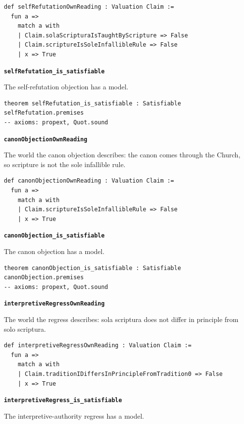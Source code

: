 \documentclass[11pt]{article}
\begin{document}
{\small\begin{verbatim}
def selfRefutationOwnReading : Valuation Claim :=
  fun a =>
    match a with
    | Claim.solaScripturaIsTaughtByScripture => False
    | Claim.scriptureIsSoleInfallibleRule => False
    | x => True
\end{verbatim}}
\par\medskip\noindent\textbf{\texttt{self\allowbreak{}Refutation\_\allowbreak{}is\_\allowbreak{}satisfiable}}\par\nobreak\noindent
The self-refutation objection has a model.

{\small\begin{verbatim}
theorem selfRefutation_is_satisfiable : Satisfiable selfRefutation.premises
-- axioms: propext, Quot.sound
\end{verbatim}}
\par\medskip\noindent\textbf{\texttt{canon\allowbreak{}Objection\allowbreak{}Own\allowbreak{}Reading}}\par\nobreak\noindent
The world the canon objection describes: the canon comes through the Church, so scripture is not the sole infallible rule.

{\small\begin{verbatim}
def canonObjectionOwnReading : Valuation Claim :=
  fun a =>
    match a with
    | Claim.scriptureIsSoleInfallibleRule => False
    | x => True
\end{verbatim}}
\par\medskip\noindent\textbf{\texttt{canon\allowbreak{}Objection\_\allowbreak{}is\_\allowbreak{}satisfiable}}\par\nobreak\noindent
The canon objection has a model.

{\small\begin{verbatim}
theorem canonObjection_is_satisfiable : Satisfiable canonObjection.premises
-- axioms: propext, Quot.sound
\end{verbatim}}
\par\medskip\noindent\textbf{\texttt{interpretive\allowbreak{}Regress\allowbreak{}Own\allowbreak{}Reading}}\par\nobreak\noindent
The world the regress describes: sola scriptura does not differ in principle from solo scriptura.

{\small\begin{verbatim}
def interpretiveRegressOwnReading : Valuation Claim :=
  fun a =>
    match a with
    | Claim.traditionIDiffersInPrincipleFromTradition0 => False
    | x => True
\end{verbatim}}
\par\medskip\noindent\textbf{\texttt{interpretive\allowbreak{}Regress\_\allowbreak{}is\_\allowbreak{}satisfiable}}\par\nobreak\noindent
The interpretive-authority regress has a model.
\end{document}
